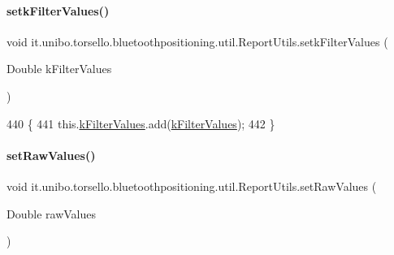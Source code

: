 \paragraph{\texorpdfstring{setk\+Filter\+Values()}{setkFilterValues()}}
{\footnotesize\ttfamily void it.\+unibo.\+torsello.\+bluetoothpositioning.\+util.\+Report\+Utils.\+setk\+Filter\+Values (\begin{DoxyParamCaption}\item[{Double}]{k\+Filter\+Values }\end{DoxyParamCaption})}


\begin{DoxyCode}
440                                                        \{
441         this.\hyperlink{classit_1_1unibo_1_1torsello_1_1bluetoothpositioning_1_1util_1_1ReportUtils_a9a40344497c5522bbc90f03581c2713a_a9a40344497c5522bbc90f03581c2713a}{kFilterValues}.add(\hyperlink{classit_1_1unibo_1_1torsello_1_1bluetoothpositioning_1_1util_1_1ReportUtils_a9a40344497c5522bbc90f03581c2713a_a9a40344497c5522bbc90f03581c2713a}{kFilterValues});
442     \}
\end{DoxyCode}
\hypertarget{classit_1_1unibo_1_1torsello_1_1bluetoothpositioning_1_1util_1_1ReportUtils_a6a65fe55f37edba3871801600cdf48f4_a6a65fe55f37edba3871801600cdf48f4}{}\label{classit_1_1unibo_1_1torsello_1_1bluetoothpositioning_1_1util_1_1ReportUtils_a6a65fe55f37edba3871801600cdf48f4_a6a65fe55f37edba3871801600cdf48f4} 
\paragraph{\texorpdfstring{set\+Raw\+Values()}{setRawValues()}}
{\footnotesize\ttfamily void it.\+unibo.\+torsello.\+bluetoothpositioning.\+util.\+Report\+Utils.\+set\+Raw\+Values (\begin{DoxyParamCaption}\item[{Double}]{raw\+Values }\end{DoxyParamCaption})}


